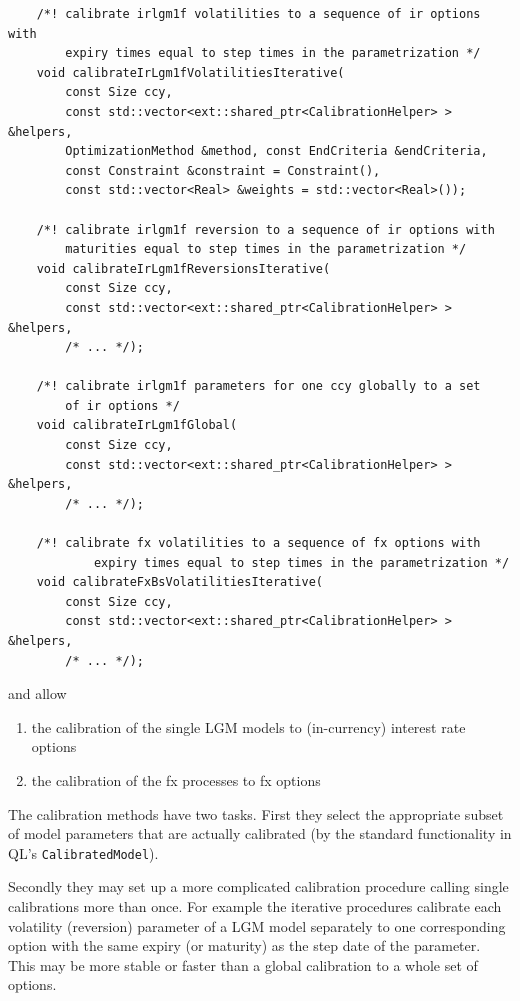 \documentclass[12pt, a4paper]{article}
\begin{document}
\medskip
\scriptsize
\begin{verbatim}
    /*! calibrate irlgm1f volatilities to a sequence of ir options with
        expiry times equal to step times in the parametrization */
    void calibrateIrLgm1fVolatilitiesIterative(
        const Size ccy,
        const std::vector<ext::shared_ptr<CalibrationHelper> > &helpers,
        OptimizationMethod &method, const EndCriteria &endCriteria,
        const Constraint &constraint = Constraint(),
        const std::vector<Real> &weights = std::vector<Real>());

    /*! calibrate irlgm1f reversion to a sequence of ir options with
        maturities equal to step times in the parametrization */
    void calibrateIrLgm1fReversionsIterative(
        const Size ccy,
        const std::vector<ext::shared_ptr<CalibrationHelper> > &helpers,
        /* ... */);

    /*! calibrate irlgm1f parameters for one ccy globally to a set
        of ir options */
    void calibrateIrLgm1fGlobal(
        const Size ccy,
        const std::vector<ext::shared_ptr<CalibrationHelper> > &helpers,
        /* ... */);

    /*! calibrate fx volatilities to a sequence of fx options with
            expiry times equal to step times in the parametrization */
    void calibrateFxBsVolatilitiesIterative(
        const Size ccy,
        const std::vector<ext::shared_ptr<CalibrationHelper> > &helpers,
        /* ... */);
\end{verbatim}
\normalsize
\medskip

and allow

\begin{enumerate}
\item the calibration of the single LGM models to (in-currency) interest rate options
\item the calibration of the fx processes to fx options
\end{enumerate}

The calibration methods have two tasks. First they select the appropriate subset of model parameters that are actually calibrated (by the standard functionality in QL's \verb+CalibratedModel+).

Secondly they may set up a more complicated calibration procedure calling single calibrations more than once. For example the iterative procedures calibrate each volatility (reversion) parameter of a LGM model separately to one corresponding option with the same expiry (or maturity) as the step date of the parameter. This may be more stable or faster than a global calibration to a whole set of options.
\end{document}
